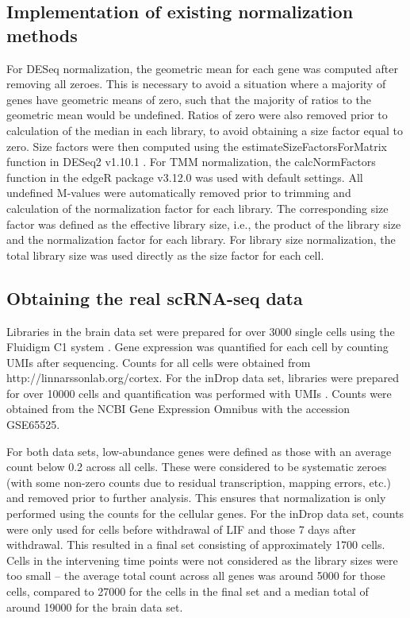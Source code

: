 \documentclass{bmcart}
\begin{document}
\subsection*{Implementation of existing normalization methods}
For DESeq normalization, the geometric mean for each gene was computed after removing all zeroes.
This is necessary to avoid a situation where a majority of genes have geometric means of zero, such that the majority of ratios to the geometric mean would be undefined.
Ratios of zero were also removed prior to calculation of the median in each library, to avoid obtaining a size factor equal to zero.
Size factors were then computed using the estimateSizeFactorsForMatrix function in DESeq2 v1.10.1 \cite{love2014moderated}.
For TMM normalization, the calcNormFactors function in the edgeR package v3.12.0 \cite{robinson2010edgeR} was used with default settings.
All undefined M-values were automatically removed prior to trimming and calculation of the normalization factor for each library.
The corresponding size factor was defined as the effective library size, i.e., the product of the library size and the normalization factor for each library.
For library size normalization, the total library size was used directly as the size factor for each cell.

\subsection*{Obtaining the real scRNA-seq data}
Libraries in the brain data set were prepared for over 3000 single cells using the Fluidigm C1 system \cite{zeisel2015brain}.
Gene expression was quantified for each cell by counting UMIs after sequencing.
Counts for all cells were obtained from {http://linnarssonlab.org/cortex}.
For the inDrop data set, libraries were prepared for over 10000 cells and quantification was performed with UMIs \cite{klein2015droplet}.
Counts were obtained from the NCBI Gene Expression Omnibus with the accession GSE65525.

For both data sets, low-abundance genes were defined as those with an average count below 0.2 across all cells.
These were considered to be systematic zeroes (with some non-zero counts due to residual transcription, mapping errors, etc.) and removed prior to further analysis.
This ensures that normalization is only performed using the counts for the cellular genes.
For the inDrop data set, counts were only used for cells before withdrawal of LIF and those 7 days after withdrawal.
This resulted in a final set consisting of approximately 1700 cells.
Cells in the intervening time points were not considered as the library sizes were too small -- the average total count across all genes was around 5000 for those cells,
    compared to 27000 for the cells in the final set and a median total of around 19000 for the brain data set.
\end{document}
